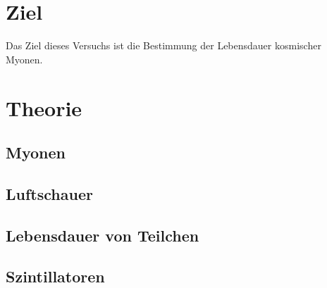 \section{Ziel}
Das Ziel dieses Versuchs ist die Bestimmung der Lebensdauer kosmischer Myonen.

\section{Theorie}

\subsection{Myonen}

\subsection{Luftschauer}

\subsection{Lebensdauer von Teilchen}

\subsection{Szintillatoren}
